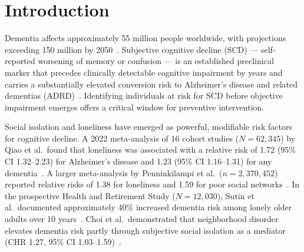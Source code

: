 \documentclass[12pt,a4paper]{article}
\begin{document}
\begin{abstract}
\noindent\textbf{Conclusions:}
An XGBoost model trained on routine BRFSS social and health data detects SCD
with AUROC 0.77, offering a no-biomarker population-level screening tool with
high NPV (0.92). At $N = 192{,}567$, this is among the largest U.S.\ BRFSS ML studies focused on multi-dimensional social isolation features for SCD screening; results are consistent with the concurrent BRFSS benchmark by Nguyen et al.\ \cite{Nguyen2026} ($N = 298{,}944$, AUROC $\approx$0.76--0.77). Depression co-morbidity dominates prediction; the MSII adds incremental signal (ablation $\Delta$AUROC = +0.006, NRI = 0.218). The model's NNS of 3.2 supports its utility as a first-tier screening instrument for primary care social prescribing pathways.
\end{abstract}

\newpage
\tableofcontents
\newpage

\section{Introduction}

Dementia affects approximately 55 million people worldwide, with projections
exceeding 150 million by 2050~\cite{Qiao2022}. Subjective cognitive decline (SCD)
--- self-reported worsening of memory or confusion --- is an established
preclinical marker that precedes clinically detectable cognitive impairment by
years and carries a substantially elevated conversion risk to Alzheimer's disease
and related dementias (ADRD)~\cite{Jessen2014}. Identifying individuals at risk
for SCD before objective impairment emerges offers a critical window for
preventive intervention.

Social isolation and loneliness have emerged as powerful, modifiable risk
factors for cognitive decline. A 2022 meta-analysis of 16 cohort studies
($N = 62{,}345$) by Qiao et al.\ found that loneliness was associated with a
relative risk of 1.72 (95\% CI 1.32--2.23) for Alzheimer's disease and 1.23
(95\% CI 1.16--1.31) for any dementia~\cite{Qiao2022}. A larger meta-analysis
by Penninkilampi et al.\ ($n = 2{,}370{,}452$) reported relative risks of 1.38
for loneliness and 1.59 for poor social networks~\cite{Penninkilampi2018}.
In the prospective Health and Retirement Study ($N = 12{,}030$), Sutin et al.\
documented approximately 40\% increased dementia risk among lonely older
adults over 10 years~\cite{Sutin2018}. Choi et al.\ demonstrated that
neighborhood disorder elevates dementia risk partly through subjective social
isolation as a mediator (CHR 1.27, 95\% CI 1.03--1.59)~\cite{Choi2024}.
\end{document}
